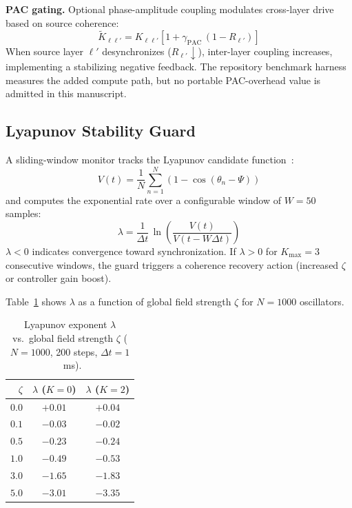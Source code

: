 \documentclass[twocolumn,preprintnumbers,amsmath,amssymb,prl,floatfix]{revtex4-2}
\begin{document}
\textbf{PAC gating.}\quad
Optional phase-amplitude coupling modulates cross-layer
drive based on source coherence:
%
\begin{equation}
  \tilde{K}_{\ell\ell'} = K_{\ell\ell'}
  \left[1 + \gamma_\mathrm{PAC}\,(1 - R_{\ell'})\right]
\end{equation}
%
When source layer $\ell'$ desynchronizes ($R_{\ell'} \downarrow$),
inter-layer coupling increases, implementing a stabilizing
negative feedback. The repository benchmark harness measures the added compute
path, but no portable PAC-overhead value is admitted in this manuscript.

\subsection{Lyapunov Stability Guard}
\label{sec:lyapunov}

A sliding-window monitor tracks the Lyapunov candidate
function~\cite{acebron2005}:
%
\begin{equation}
  V(t) = \frac{1}{N}\sum_{n=1}^{N}
  \left(1 - \cos(\theta_n - \Psi)\right)
\end{equation}
%
and computes the exponential rate over a configurable window
of $W = 50$ samples:
%
\begin{equation}
  \lambda = \frac{1}{\Delta t}\,
  \ln\!\left(\frac{V(t)}{V(t - W\Delta t)}\right)
  \label{eq:lambda}
\end{equation}
%
$\lambda < 0$ indicates convergence toward synchronization.
If $\lambda > 0$ for $K_\mathrm{max} = 3$ consecutive windows,
the guard triggers a coherence recovery action (increased $\zeta$
or controller gain boost).

Table~\ref{tab:lyapunov} shows $\lambda$ as a function of global
field strength $\zeta$ for $N = 1000$ oscillators.

\begin{table}[tb]
\centering
\caption{Lyapunov exponent $\lambda$ vs.\ global field strength
$\zeta$ ($N = 1000$, 200 steps, $\Delta t = 1$~ms).}
\label{tab:lyapunov}
\begin{tabular}{rcc}
\toprule
$\zeta$ & $\lambda$ ($K=0$) & $\lambda$ ($K=2$) \\
\midrule
$0.0$ & $+0.01$ & $+0.04$ \\
$0.1$ & $-0.03$ & $-0.02$ \\
$0.5$ & $-0.23$ & $-0.24$ \\
$1.0$ & $-0.49$ & $-0.53$ \\
$3.0$ & $-1.65$ & $-1.83$ \\
$5.0$ & $-3.01$ & $-3.35$ \\
\bottomrule
\end{tabular}
\end{table}
\end{document}
